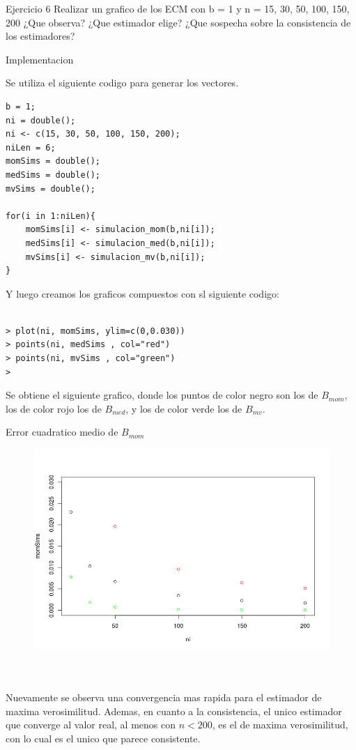 



\begin{section}{Ejercicio 6}
Realizar un grafico de los ECM con b = 1 y n = 15, 30, 50, 100, 150, 200 ¿Que observa? ¿Que
estimador elige? ¿Que sospecha sobre la consistencia de los estimadores?

\begin{subsection}{Implementacion}


Se utiliza el siguiente codigo para generar los vectores.
\begin{verbatim}
b = 1;
ni = double();
ni <- c(15, 30, 50, 100, 150, 200);
niLen = 6;
momSims = double();
medSims = double();
mvSims = double();

for(i in 1:niLen){
	momSims[i] <- simulacion_mom(b,ni[i]);
	medSims[i] <- simulacion_med(b,ni[i]);
	mvSims[i] <- simulacion_mv(b,ni[i]);
}

\end{verbatim}

Y luego creamos los graficos compuestos con sl siguiente codigo:

\begin{verbatim}

> plot(ni, momSims, ylim=c(0,0.030))
> points(ni, medSims , col="red")
> points(ni, mvSims , col="green")
> 

\end{verbatim}

Se obtiene el siguiente grafico, donde los puntos de color negro son los de $B_{mom}$, los de color rojo los de $B_{med}$, y los de color verde los de $B_{mv}$.


Error cuadratico medio de $B_{mom}$
\begin{figure}[H]
\includegraphics[scale=0.65]{plots/combNPlot.png}
\centering
\end{figure}
~\\
~\\



Nuevamente se observa una convergencia mas rapida para el estimador de maxima verosimilitud. Ademas, en cuanto a la consistencia, el unico estimador que converge al valor real, al menos con $n<200$, es el de maxima verosimilitud, con lo cual es el unico que parece consistente.
\end{subsection}
\end{section}